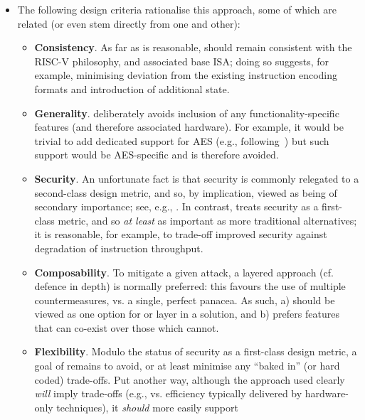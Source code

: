 \documentclass{article}
\begin{document}
\begin{itemize}
\item The following design criteria rationalise this approach, some of which
      are related (or even stem directly from one and other):

      \begin{itemize}
      \item {\bf      Consistency}.
            As far as is reasonable, \ISE should remain consistent with the
            RISC-V philosophy, and associated base ISA; doing so suggests,
            for example, minimising deviation from the existing instruction
            encoding formats and introduction of additional state.

      \item {\bf       Generality}.
            \ISE deliberately avoids inclusion of any functionality-specific 
            features (and therefore associated hardware).  For example, it
            would be trivial to add dedicated support for AES
            (e.g., following~\cite{SCARV:TilGro:06})
            but such support would be AES-specific and is therefore avoided.

      \item {\bf         Security}.
            An unfortunate fact is that security is commonly relegated to a 
            second-class design metric, and so, by implication, viewed as 
            being of secondary importance;
            see, e.g., \cite{SCARV:RKLMR:03,SCARV:RRKH:04,SCARV:BurMutTiw:16}.
            In contrast, \ISE treats security as a first-class metric, and
            so {\em at least} as important as more traditional alternatives; 
            it is reasonable, for example, to trade-off improved security 
            against degradation of instruction throughput.

      \item {\bf    Composability}.
            To mitigate a given attack, a layered approach (cf. defence in 
            depth) is normally preferred: this favours the use of multiple
            countermeasures, vs. a single, perfect panacea.  As such, \ISE
            a) should be viewed as one option for or layer in a solution,
               and
            b) prefers features that can co-exist over those which cannot.

      \item {\bf      Flexibility}. 
            Modulo the status of security as a first-class design metric, a
            goal of \ISE remains to avoid, or at least minimise any ``baked 
            in'' (or hard coded) trade-offs.  Put another way, although the 
            approach used clearly {\em will} imply trade-offs 
            (e.g., vs. efficiency typically delivered by hardware-only techniques), 
            it {\em should} more easily support


\end{itemize}
\end{itemize}
\end{document}
